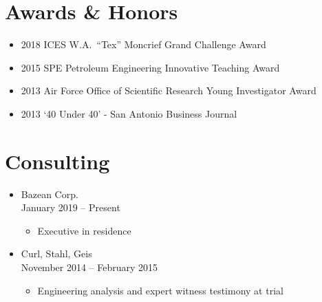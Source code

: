 \section*{Awards \& Honors}

\begin{itemize}
    \item 2018 ICES W.A.\ ``Tex'' Moncrief Grand Challenge Award
    \item 2015 SPE Petroleum Engineering Innovative Teaching Award 
    \item 2013 Air Force Office of Scientific Research Young Investigator Award
    \item 2013 `40 Under 40' - San Antonio Business Journal
\end{itemize}


\ifdefined\ispdf
\section*{Consulting}

\begin{itemize}
    \item Bazean Corp. \\
          January 2019 -- Present
    \begin{itemize}
        \item Executive in residence
    \end{itemize}
    \item Curl, Stahl, Geis \\
          November 2014 -- February 2015
    \begin{itemize}
        \item Engineering analysis and expert witness testimony at trial
    \end{itemize}
\end{itemize}
\fi
\fi
